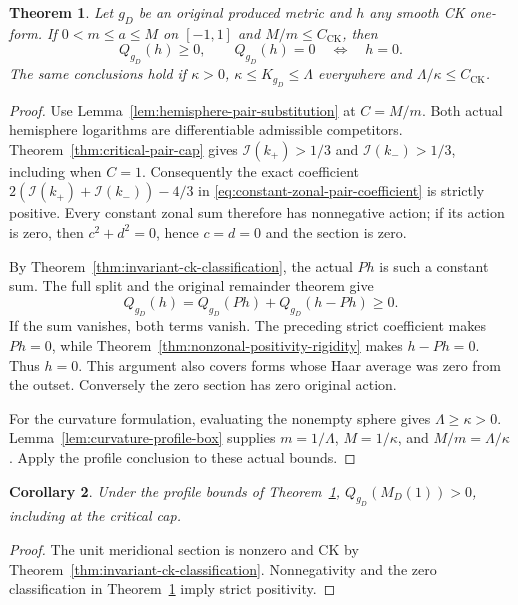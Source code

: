 \documentclass[11pt]{article}
\newtheorem{theorem}{Theorem}[section]
\newtheorem{corollary}[theorem]{Corollary}
\newcommand{\I}{\mathcal I}
\begin{document}
\begin{theorem}\label{thm:produced-ck-safety}
Let $g_D$ be an original produced metric and $h$ any smooth CK one-form.
If $0<m\leq a\leq M$ on $[-1,1]$ and $M/m\leq C_{\mathrm{CK}}$, then
\begin{equation}\label{eq:produced-ck-safety}
 Q_{g_D}(h)\geq0,\qquad Q_{g_D}(h)=0\quad\Longleftrightarrow\quad h=0.
\end{equation}
The same conclusions hold if $\kappa>0$,
$\kappa\leq K_{g_D}\leq\Lambda$ everywhere and
$\Lambda/\kappa\leq C_{\mathrm{CK}}$.
\end{theorem}

\begin{proof}
Use Lemma~\ref{lem:hemisphere-pair-substitution} at $C=M/m$.
Both actual hemisphere logarithms are differentiable admissible competitors.
Theorem~\ref{thm:critical-pair-cap} gives
$\I(k_+)>1/3$ and $\I(k_-)>1/3$, including when $C=1$.
Consequently the exact coefficient
$2(\I(k_+)+\I(k_-))-4/3$ in
\eqref{eq:constant-zonal-pair-coefficient} is strictly positive.
Every constant zonal sum therefore has nonnegative action; if its action
is zero, then $c^2+d^2=0$, hence $c=d=0$ and the section is zero.

By Theorem~\ref{thm:invariant-ck-classification}, the actual $Ph$ is such
a constant sum. The full split and the original remainder theorem give
\[
 Q_{g_D}(h)=Q_{g_D}(Ph)+Q_{g_D}(h-Ph)\geq0.
\]
If the sum vanishes, both terms vanish. The preceding strict coefficient
makes $Ph=0$, while Theorem~\ref{thm:nonzonal-positivity-rigidity}
makes $h-Ph=0$. Thus $h=0$. This argument also covers forms whose
Haar average was zero from the outset. Conversely the zero section
has zero original action.

For the curvature formulation, evaluating the nonempty sphere gives
$\Lambda\geq\kappa>0$. Lemma~\ref{lem:curvature-profile-box} supplies
$m=1/\Lambda$, $M=1/\kappa$, and $M/m=\Lambda/\kappa$.
Apply the profile conclusion to these actual bounds.
\end{proof}

\begin{corollary}\label{cor:fixed-unit-probe-positive}
Under the profile bounds of Theorem~\ref{thm:produced-ck-safety},
$Q_{g_D}(M_D(1))>0$, including at the critical cap.
\end{corollary}

\begin{proof}
The unit meridional section is nonzero and CK by
Theorem~\ref{thm:invariant-ck-classification}. Nonnegativity and the zero
classification in Theorem~\ref{thm:produced-ck-safety} imply strict positivity.
\end{proof}
\end{document}
